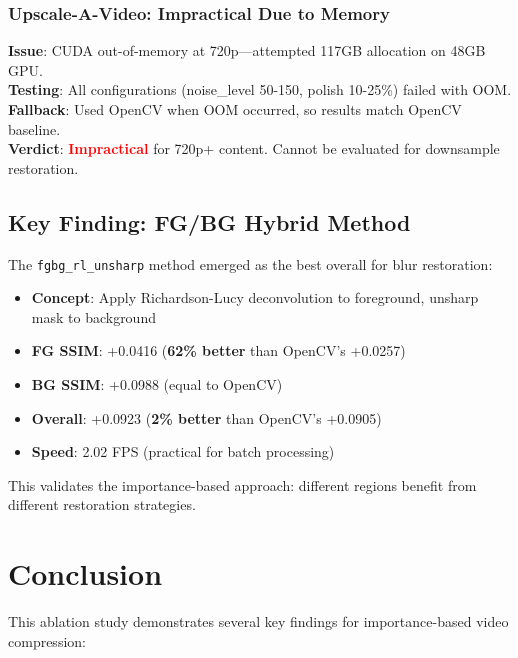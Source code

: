 \documentclass[11pt,a4paper]{article}
\begin{document}
\subsubsection{Upscale-A-Video: Impractical Due to Memory}
\textbf{Issue}: CUDA out-of-memory at 720p---attempted 117GB allocation on 48GB GPU.\\
\textbf{Testing}: All configurations (noise\_level 50-150, polish 10-25\%) failed with OOM.\\
\textbf{Fallback}: Used OpenCV when OOM occurred, so results match OpenCV baseline.\\
\textbf{Verdict}: \textcolor{red}{\textbf{Impractical}} for 720p+ content. Cannot be evaluated for downsample restoration.

\subsection{Key Finding: FG/BG Hybrid Method}

The \texttt{fgbg\_rl\_unsharp} method emerged as the best overall for blur restoration:
\begin{itemize}
    \item \textbf{Concept}: Apply Richardson-Lucy deconvolution to foreground, unsharp mask to background
    \item \textbf{FG SSIM}: +0.0416 (\textbf{62\% better} than OpenCV's +0.0257)
    \item \textbf{BG SSIM}: +0.0988 (equal to OpenCV)
    \item \textbf{Overall}: +0.0923 (\textbf{2\% better} than OpenCV's +0.0905)
    \item \textbf{Speed}: 2.02 FPS (practical for batch processing)
\end{itemize}

This validates the importance-based approach: different regions benefit from different restoration strategies.

\section{Conclusion}

This ablation study demonstrates several key findings for importance-based video compression:
\end{document}
